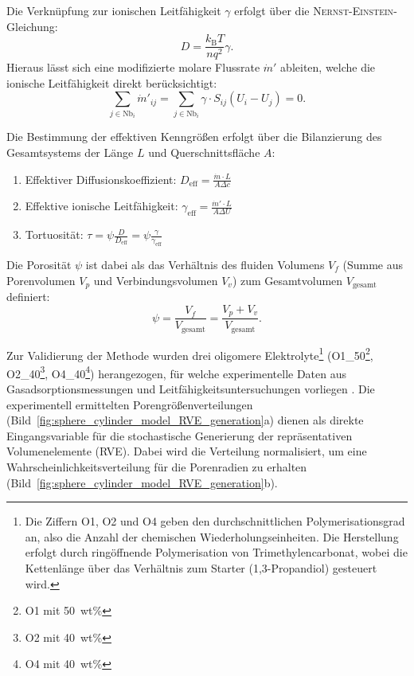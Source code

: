Die Verknüpfung zur ionischen Leitfähigkeit $\gamma$ erfolgt über die \textsc{Nernst-Einstein}-Gleichung:
\begin{equation}
    D = \frac{k_{\text{B}}T}{n q^2} \gamma.
\end{equation}
Hieraus lässt sich eine modifizierte molare Flussrate $\dot{m}'$ ableiten, welche die ionische Leitfähigkeit direkt berücksichtigt:
\begin{equation}
    \sum_{j \in \text{Nb}_i} \dot{m}'_{ij} = \sum_{j \in \text{Nb}_i} \gamma \cdot S_{ij} (U_i - U_j) = 0.
\end{equation}

Die Bestimmung der effektiven Kenngrößen erfolgt über die Bilanzierung des Gesamtsystems der Länge $L$ und Querschnittsfläche $A$:
\begin{enumerate}
    \item Effektiver Diffusionskoeffizient: $D_{\text{eff}} = \frac{\dot{m} \cdot L}{A \Delta c}$
    \item Effektive ionische Leitfähigkeit: $\gamma_{\text{eff}} = \frac{\dot{m}' \cdot L}{A \Delta U}$
    \item Tortuosität: $\tau = \psi \frac{D}{D_{\text{eff}}} = \psi \frac{\gamma}{\gamma_{\text{eff}}}$
\end{enumerate}
Die Porosität $\psi$ ist dabei als das Verhältnis des fluiden Volumens $V_f$ (Summe aus Porenvolumen $V_p$ und Verbindungsvolumen $V_v$) zum Gesamtvolumen $V_{\text{gesamt}}$ definiert:
\begin{equation}
    \psi = \frac{V_f}{V_{\text{gesamt}}} = \frac{V_p + V_v}{V_{\text{gesamt}}}.
\end{equation}

Zur Validierung der Methode wurden drei oligomere Elektrolyte\footnote{Die Ziffern O1, O2 und O4 geben den durchschnittlichen Polymerisationsgrad an, also die Anzahl der chemischen Wiederholungseinheiten. Die Herstellung erfolgt durch ringöffnende Polymerisation von Trimethylencarbonat, wobei die Kettenlänge über das Verhältnis zum Starter (1,3-Propandiol) gesteuert wird.} (O1\_50\footnote{O1 mit 50~wt\% }, O2\_40\footnote{O2 mit 40~wt\% }, O4\_40\footnote{O4 mit 40~wt\% }) herangezogen, für welche experimentelle Daten aus Gasadsorptionsmessungen und Leitfähigkeitsuntersuchungen vorliegen \cite{Emilsson2023}. Die experimentell ermittelten Porengrößenverteilungen (Bild~\ref{fig:sphere_cylinder_model_RVE_generation}a) dienen als direkte Eingangsvariable für die stochastische Generierung der repräsentativen Volumenelemente (RVE). Dabei wird die Verteilung normalisiert, um eine Wahrscheinlichkeitsverteilung für die Porenradien zu erhalten (Bild~\ref{fig:sphere_cylinder_model_RVE_generation}b).

